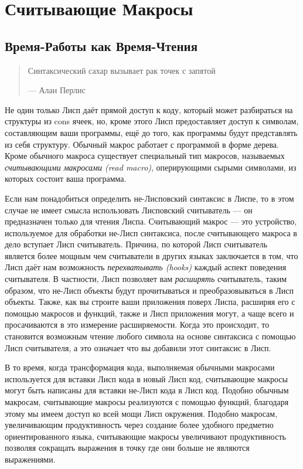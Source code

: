 \chapter{Считывающие Макросы}\label{chapter_reading_macros}
\section{Время-Работы как Время-Чтения}\label{section_run-time_at_read-time}

\begin{quote}
Синтаксический сахар вызывает рак точек с запятой

--- Алан Перлис
\end{quote}

Не один только Лисп даёт прямой доступ к коду, который может разбираться на структуры из cons ячеек, но, кроме этого Лисп предоставляет доступ к символам, составляющим ваши программы, ещё до того, как программы будут представлять из себя структуру. Обычный макрос работает с программой в форме дерева. Кроме обычного макроса существует специальный тип макросов, называемых \emph{считывающими макросами (read macro)}, оперирующими сырыми символами, из которых состоит ваша программа.

Если нам понадобиться определить не-Лисповский синтаксис в Лиспе, то в этом случае не имеет смысла использовать Лисповский считыватель --- он предназначен только для чтения Лиспа. Считывающий макрос --- это устройство, используемое для обработки не-Лисп синтаксиса, после считывающего макроса в дело вступает Лисп считыватель. Причина, по которой Лисп считыватель является более мощным чем считыватели в других языках заключается в том, что Лисп даёт нам возможность \emph{перехватывать (hooks)} каждый аспект поведения считывателя. В частности, Лисп позволяет вам \emph{расширять} считыватель, таким образом, что не-Лисп объекты будут прочитываться и преобразовываться в Лисп объекты. Также, как вы строите ваши приложения поверх Лиспа, расширяя его с помощью макросов и функций, также и Лисп приложения могут, а чаще всего и просачиваются в это измерение расширяемости. Когда это происходит, то становится возможным чтение любого символа на основе синтаксиса с помощью Лисп считывателя, а это означает что вы добавили этот синтаксис в Лисп.

В то время, когда трансформация кода, выполняемая обычными макросами используется для вставки Лисп кода в новый Лисп код, считывающие макросы могут быть написаны для вставки не-Лисп кода в Лисп код. Подобно обычным макросам, считывающие макросы реализуются с помощью функций, благодаря этому мы имеем доступ ко всей мощи Лисп окружения. Подобно макросам, увеличивающим продуктивность через создание более удобного предметно ориентированного языка, считывающие макросы увеличивают продуктивность позволяя сокращать выражения в точку где они больше не являются выражениями.

